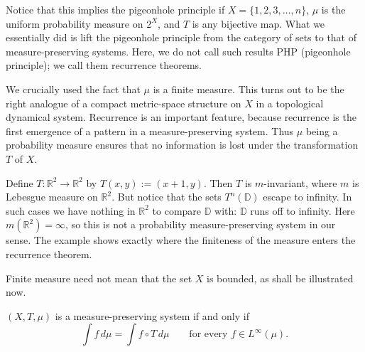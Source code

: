 \documentclass[11pt,a4paper]{article}
\begin{document}
\begin{remark}
Notice that this implies the pigeonhole principle if $X=\{1,2,3,\ldots,n\}$,
$\mu$ is the uniform probability measure on $2^X$, and $T$ is any bijective
map. What we essentially did is lift the pigeonhole principle from the
category of sets to that of measure-preserving systems. Here, we do not call
such results PHP (pigeonhole principle); we call them recurrence theorems.
\end{remark}

\begin{remark}
We crucially used the fact that $\mu$ is a finite measure. This turns out to
be the right analogue of a compact metric-space structure on $X$ in a
topological dynamical system. Recurrence is an important feature, because
recurrence is the first emergence of a pattern in a measure-preserving
system. Thus $\mu$ being a probability measure ensures that no information is
lost under the transformation $T$ of $X$.
\end{remark}

\begin{remark}
Define $T\colon\mathbb R^2\to\mathbb R^2$ by $T(x,y):=(x+1,y)$. Then $T$ is
$m$-invariant, where $m$ is Lebesgue measure on $\mathbb R^2$. But notice that
the sets $T^n(\mathbb D)$ escape to infinity. In such cases we have nothing in
$\mathbb R^2$ to compare $\mathbb D$ with: $\mathbb D$ runs off to infinity.
Here $m(\mathbb R^2)=\infty$, so this is not a probability
measure-preserving system in our sense. The example shows exactly where the
finiteness of the measure enters the recurrence theorem.
\end{remark}

\begin{remark}
Finite measure need not mean that the set $X$ is bounded, as shall be
illustrated now.
\end{remark}

\setcounter{theorem}{4}\begin{lemma}
$(X,T,\mu)$ is a measure-preserving system if and only if
\[
  \int f\,d\mu=\int f\circ T\,d\mu
  \qquad\text{for every }f\in L^\infty(\mu).
\]
\end{lemma}
\end{document}
